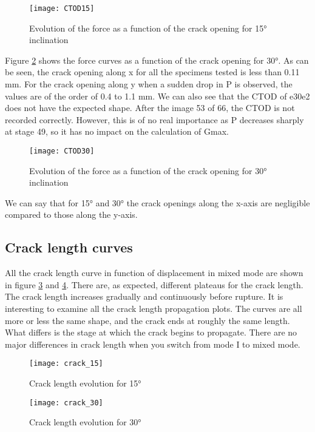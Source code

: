 \begin{figure}[H]
	\centering
	\texttt{[image: CTOD15]}
	\caption{Evolution of the force as a function of the crack opening for 15° inclination}
	\label{fig:CTOD15}
\end{figure}

Figure \ref{fig:CTOD30} shows the force curves as a function of the crack opening for 30°. As can be seen, the crack opening along x for all the specimens tested is less than 0.11 mm. For the crack opening along y when a sudden drop in P is observed, the values are of the order of 0.4 to 1.1 mm. 
We can also see that the CTOD of e30e2 does not have the expected shape. After the image 53 of 66, the CTOD is not recorded correctly. However, this is of no real importance as P decreases sharply at stage 49, so it has no impact on the calculation of Gmax.

\begin{figure}[H]
	\centering
	\texttt{[image: CTOD30]}
	\caption{Evolution of the force as a function of the crack opening for 30° inclination}
	\label{fig:CTOD30}
\end{figure}

We can say that for 15° and 30° the crack openings along the x-axis are negligible compared to those along the y-axis. 

\subsection{Crack length curves}

All the crack length curve in function of displacement in mixed mode are shown in figure \ref{fig:crack_15} and \ref{fig:crack_30}. 
There are, as expected, different plateaus for the crack length. The crack length increases gradually and continuously before rupture. It is interesting to examine all the crack length propagation plots.  The curves are all more or less the same shape, and the crack ends at roughly the same length. What differs is the stage at which the crack begins to propagate. There are no major differences in crack length when you switch from mode I to mixed mode.

\begin{figure}[htp]
	\centering
	\texttt{[image: crack\_15]}
	\caption{Crack length evolution for 15°}
	\label{fig:crack_15}
\end{figure}

\begin{figure}[htp]
	\centering
	\texttt{[image: crack\_30]}
	\caption{Crack length evolution for 30°}
	\label{fig:crack_30}
\end{figure}

